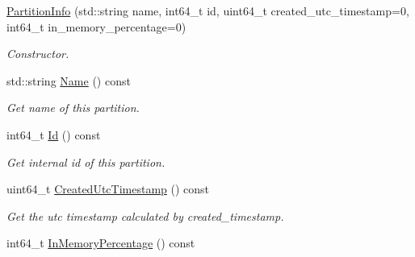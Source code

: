 \begin{DoxyCompactItemize}
\item 
\mbox{\label{classmilvus_1_1_partition_info_a6ff5836b7cda5f6de16263b36e28409e}} 
\hyperlink{classmilvus_1_1_partition_info_a6ff5836b7cda5f6de16263b36e28409e}{Partition\+Info} (std\+::string name, int64\+\_\+t id, uint64\+\_\+t created\+\_\+utc\+\_\+timestamp=0, int64\+\_\+t in\+\_\+memory\+\_\+percentage=0)
\begin{DoxyCompactList}\small\item\em Constructor. \end{DoxyCompactList}\item 
\mbox{\label{classmilvus_1_1_partition_info_abce6b71f98c1418c632b6d284ce0116c}} 
std\+::string \hyperlink{classmilvus_1_1_partition_info_abce6b71f98c1418c632b6d284ce0116c}{Name} () const
\begin{DoxyCompactList}\small\item\em Get name of this partition. \end{DoxyCompactList}\item 
\mbox{\label{classmilvus_1_1_partition_info_a58e31cc567e27b7f73b0f0a7cf6749d3}} 
int64\+\_\+t \hyperlink{classmilvus_1_1_partition_info_a58e31cc567e27b7f73b0f0a7cf6749d3}{Id} () const
\begin{DoxyCompactList}\small\item\em Get internal id of this partition. \end{DoxyCompactList}\item 
\mbox{\label{classmilvus_1_1_partition_info_a09043cbc379c5d2d3939137b78bc3af0}} 
uint64\+\_\+t \hyperlink{classmilvus_1_1_partition_info_a09043cbc379c5d2d3939137b78bc3af0}{Created\+Utc\+Timestamp} () const
\begin{DoxyCompactList}\small\item\em Get the utc timestamp calculated by created\+\_\+timestamp. \end{DoxyCompactList}\item 
\mbox{\label{classmilvus_1_1_partition_info_aa760577d344207a0a170ab30e92f244d}} 
int64\+\_\+t \hyperlink{classmilvus_1_1_partition_info_aa760577d344207a0a170ab30e92f244d}{In\+Memory\+Percentage} () const

\end{DoxyCompactItemize}

